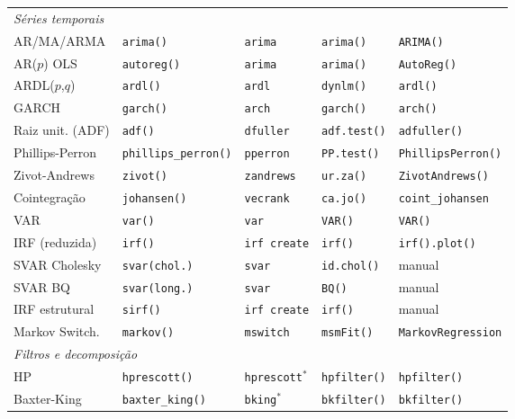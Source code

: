 {\begin{longtable}{lllll}
\midrule
\multicolumn{5}{l}{\textit{Séries temporais}} \\
AR/MA/ARMA      & \texttt{arima()}      & \texttt{arima}        & \texttt{arima()}       & \texttt{ARIMA()} \\
AR($p$) OLS     & \texttt{autoreg()}    & \texttt{arima}        & \texttt{arima()}       & \texttt{AutoReg()} \\
ARDL($p$,$q$)   & \texttt{ardl()}       & \texttt{ardl}         & \texttt{dynlm()}       & \texttt{ardl()} \\
GARCH           & \texttt{garch()}      & \texttt{arch}         & \texttt{garch()}       & \texttt{arch()} \\
Raiz unit. (ADF) & \texttt{adf()}       & \texttt{dfuller}      & \texttt{adf.test()}    & \texttt{adfuller()} \\
Phillips-Perron & \texttt{phillips\_perron()} & \texttt{pperron} & \texttt{PP.test()}   & \texttt{PhillipsPerron()} \\
Zivot-Andrews   & \texttt{zivot()}      & \texttt{zandrews}     & \texttt{ur.za()}       & \texttt{ZivotAndrews()} \\
Cointegração    & \texttt{johansen()}   & \texttt{vecrank}      & \texttt{ca.jo()}       & \texttt{coint\_johansen} \\
VAR             & \texttt{var()}        & \texttt{var}          & \texttt{VAR()}         & \texttt{VAR()} \\
IRF (reduzida)  & \texttt{irf()}        & \texttt{irf create}   & \texttt{irf()}         & \texttt{irf().plot()} \\
SVAR Cholesky   & \texttt{svar(chol.)}  & \texttt{svar}         & \texttt{id.chol()}     & manual \\
SVAR BQ         & \texttt{svar(long.)}  & \texttt{svar}         & \texttt{BQ()}          & manual \\
IRF estrutural  & \texttt{sirf()}       & \texttt{irf create}   & \texttt{irf()}         & manual \\
Markov Switch.  & \texttt{markov()}     & \texttt{mswitch}      & \texttt{msmFit()}      & \texttt{MarkovRegression} \\
\midrule
\multicolumn{5}{l}{\textit{Filtros e decomposição}} \\
HP              & \texttt{hprescott()}  & \texttt{hprescott}$^*$ & \texttt{hpfilter()}  & \texttt{hpfilter()} \\
Baxter-King     & \texttt{baxter\_king()} & \texttt{bking}$^*$  & \texttt{bkfilter()}   & \texttt{bkfilter()} \\

\end{longtable}}
